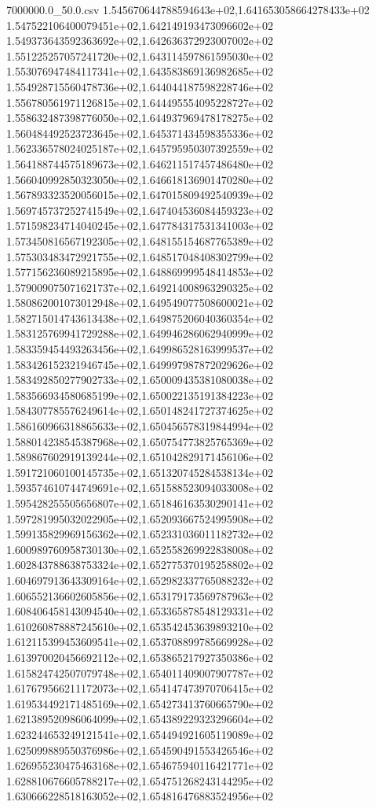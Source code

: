 \begin{filecontents*}{7000000.0_50.0.csv}
1.545670644788594643e+02,1.641653058664278433e+02
1.547522106400079451e+02,1.642149193473096602e+02
1.549373643592363692e+02,1.642636372923007002e+02
1.551225257057241720e+02,1.643114597861595030e+02
1.553076947484117341e+02,1.643583869136982685e+02
1.554928715560478736e+02,1.644044187598228746e+02
1.556780561971126815e+02,1.644495554095228727e+02
1.558632487398776050e+02,1.644937969478178275e+02
1.560484492523723645e+02,1.645371434598355336e+02
1.562336578024025187e+02,1.645795950307392559e+02
1.564188744575189673e+02,1.646211517457486480e+02
1.566040992850323050e+02,1.646618136901470280e+02
1.567893323520056015e+02,1.647015809492540939e+02
1.569745737252741549e+02,1.647404536084459323e+02
1.571598234714040245e+02,1.647784317531341003e+02
1.573450816567192305e+02,1.648155154687765389e+02
1.575303483472921755e+02,1.648517048408302799e+02
1.577156236089215895e+02,1.648869999548414853e+02
1.579009075071621737e+02,1.649214008963290325e+02
1.580862001073012948e+02,1.649549077508600021e+02
1.582715014743613438e+02,1.649875206040360354e+02
1.583125769941729288e+02,1.649946286062940999e+02
1.583359454493263456e+02,1.649986528163999537e+02
1.583426152321946745e+02,1.649997987872029626e+02
1.583492850277902733e+02,1.650009435381080038e+02
1.583566934580685199e+02,1.650022135191384223e+02
1.584307785576249614e+02,1.650148241727374625e+02
1.586160966318865633e+02,1.650456578319844994e+02
1.588014238545387968e+02,1.650754773825765369e+02
1.589867602919139244e+02,1.651042829171456106e+02
1.591721060100145735e+02,1.651320745284538134e+02
1.593574610744749691e+02,1.651588523094033008e+02
1.595428255505656807e+02,1.651846163530290141e+02
1.597281995032022905e+02,1.652093667524995908e+02
1.599135829969156362e+02,1.652331036011182732e+02
1.600989760958730130e+02,1.652558269922838008e+02
1.602843788638753324e+02,1.652775370195258802e+02
1.604697913643309164e+02,1.652982337765088232e+02
1.606552136602605856e+02,1.653179173569787963e+02
1.608406458143094540e+02,1.653365878548129331e+02
1.610260878887245610e+02,1.653542453639893210e+02
1.612115399453609541e+02,1.653708899785669928e+02
1.613970020456692112e+02,1.653865217927350386e+02
1.615824742507079748e+02,1.654011409007907787e+02
1.617679566211172073e+02,1.654147473970706415e+02
1.619534492171485169e+02,1.654273413760665790e+02
1.621389520986064099e+02,1.654389229323296604e+02
1.623244653249121541e+02,1.654494921605119089e+02
1.625099889550376986e+02,1.654590491553426546e+02
1.626955230475463168e+02,1.654675940116421771e+02
1.628810676605788217e+02,1.654751268243144295e+02
1.630666228518163052e+02,1.654816476883524956e+02

\end{filecontents*}
